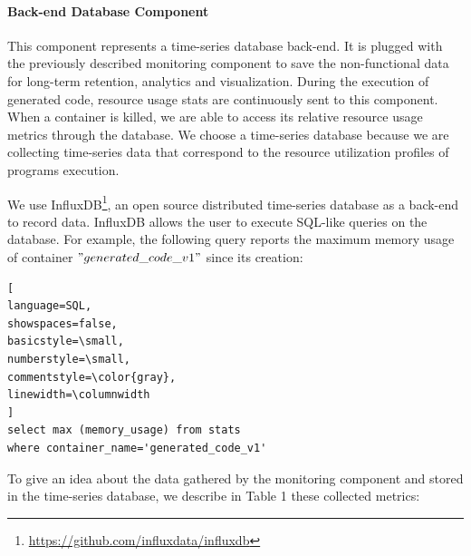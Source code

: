 \paragraph{Back-end Database Component}
This component represents a time-series database back-end. It is plugged with the previously described monitoring component to save the non-functional data for long-term retention, analytics and visualization. 
During the execution of generated code, resource usage stats are continuously sent to this component. When a container is killed, we are able to access its relative resource usage metrics through the database. We choose a time-series database because we are collecting time-series data that correspond to the resource utilization profiles of programs execution.

We use InfluxDB\footnote{\url{https://github.com/influxdata/influxdb}}, an open source distributed time-series database as a back-end to record data. InfluxDB allows the user to execute SQL-like queries on the database. For example, the following query reports the maximum memory usage of container $"generated\_code\_v1"$ since its creation:

\begin{lstlisting}[
language=SQL,
showspaces=false,
basicstyle=\small,
numberstyle=\small,
commentstyle=\color{gray},
linewidth=\columnwidth
]
select max (memory_usage) from stats 
where container_name='generated_code_v1'
\end{lstlisting}
To give an idea about the data gathered by the monitoring component and stored in the time-series database, we describe in Table 1 these collected metrics:
\begin{table}[h]
	\begin{center}
		
	\end{center}
	\caption {Resource usage metrics recorded in InfluxDB}
\end{table}

